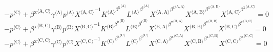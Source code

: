 \begin{equation}
-{p}^{\langle \mathrm{C}\rangle} + {{\beta^{\mathrm{x}}}^{\langle \mathrm{\mathrm{A}},\mathrm{\mathrm{C}}\rangle}} {{\gamma}^{\langle \mathrm{\mathrm{A}}\rangle}} {{p}^{\langle \mathrm{A}\rangle}} {{X}^{\langle \mathrm{A},\mathrm{C}\rangle}}^{-1} {{{K}^{\langle \mathrm{A}\rangle}}^{{\beta^{\mathrm{k}}}^{\langle \mathrm{\mathrm{A}}\rangle}}} {{{L}^{\langle \mathrm{A}\rangle}}^{{\beta^{\mathrm{l}}}^{\langle \mathrm{\mathrm{A}}\rangle}}} {{{X}^{\langle \mathrm{A},\mathrm{A}\rangle}}^{{\beta^{\mathrm{x}}}^{\langle \mathrm{\mathrm{A}},\mathrm{\mathrm{A}}\rangle}}} {{{X}^{\langle \mathrm{A},\mathrm{B}\rangle}}^{{\beta^{\mathrm{x}}}^{\langle \mathrm{\mathrm{A}},\mathrm{\mathrm{B}}\rangle}}} {{{X}^{\langle \mathrm{A},\mathrm{C}\rangle}}^{{\beta^{\mathrm{x}}}^{\langle \mathrm{\mathrm{A}},\mathrm{\mathrm{C}}\rangle}}} = 0
\end{equation}
\begin{equation}
-{p}^{\langle \mathrm{C}\rangle} + {{\beta^{\mathrm{x}}}^{\langle \mathrm{\mathrm{B}},\mathrm{\mathrm{C}}\rangle}} {{\gamma}^{\langle \mathrm{\mathrm{B}}\rangle}} {{p}^{\langle \mathrm{B}\rangle}} {{X}^{\langle \mathrm{B},\mathrm{C}\rangle}}^{-1} {{{K}^{\langle \mathrm{B}\rangle}}^{{\beta^{\mathrm{k}}}^{\langle \mathrm{\mathrm{B}}\rangle}}} {{{L}^{\langle \mathrm{B}\rangle}}^{{\beta^{\mathrm{l}}}^{\langle \mathrm{\mathrm{B}}\rangle}}} {{{X}^{\langle \mathrm{B},\mathrm{A}\rangle}}^{{\beta^{\mathrm{x}}}^{\langle \mathrm{\mathrm{B}},\mathrm{\mathrm{A}}\rangle}}} {{{X}^{\langle \mathrm{B},\mathrm{B}\rangle}}^{{\beta^{\mathrm{x}}}^{\langle \mathrm{\mathrm{B}},\mathrm{\mathrm{B}}\rangle}}} {{{X}^{\langle \mathrm{B},\mathrm{C}\rangle}}^{{\beta^{\mathrm{x}}}^{\langle \mathrm{\mathrm{B}},\mathrm{\mathrm{C}}\rangle}}} = 0
\end{equation}
\begin{equation}
-{p}^{\langle \mathrm{C}\rangle} + {{\beta^{\mathrm{x}}}^{\langle \mathrm{\mathrm{C}},\mathrm{\mathrm{C}}\rangle}} {{\gamma}^{\langle \mathrm{\mathrm{C}}\rangle}} {{p}^{\langle \mathrm{C}\rangle}} {{X}^{\langle \mathrm{C},\mathrm{C}\rangle}}^{-1} {{{K}^{\langle \mathrm{C}\rangle}}^{{\beta^{\mathrm{k}}}^{\langle \mathrm{\mathrm{C}}\rangle}}} {{{L}^{\langle \mathrm{C}\rangle}}^{{\beta^{\mathrm{l}}}^{\langle \mathrm{\mathrm{C}}\rangle}}} {{{X}^{\langle \mathrm{C},\mathrm{A}\rangle}}^{{\beta^{\mathrm{x}}}^{\langle \mathrm{\mathrm{C}},\mathrm{\mathrm{A}}\rangle}}} {{{X}^{\langle \mathrm{C},\mathrm{B}\rangle}}^{{\beta^{\mathrm{x}}}^{\langle \mathrm{\mathrm{C}},\mathrm{\mathrm{B}}\rangle}}} {{{X}^{\langle \mathrm{C},\mathrm{C}\rangle}}^{{\beta^{\mathrm{x}}}^{\langle \mathrm{\mathrm{C}},\mathrm{\mathrm{C}}\rangle}}} = 0
\end{equation}

